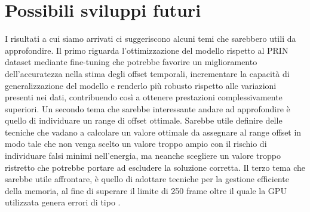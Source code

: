 \graphicspath{{chapters/chapter7/img}}
\chapter{Possibili sviluppi futuri} \label{sviluppi_futuri}
I risultati a cui siamo arrivati ci suggeriscono alcuni temi che sarebbero utili da approfondire. Il primo riguarda l'ottimizzazione del modello rispetto al PRIN dataset mediante fine-tuning che potrebbe favorire un miglioramento dell'accuratezza nella stima degli offset temporali, incrementare la capacità di generalizzazione del modello e renderlo più robusto rispetto alle variazioni presenti nei dati, contribuendo così a ottenere prestazioni complessivamente superiori. Un secondo tema che sarebbe interessante andare ad approfondire è quello di individuare un range di offset ottimale. Sarebbe utile definire delle tecniche che vadano a calcolare un valore ottimale da assegnare al range offset in modo tale che non venga scelto un valore troppo ampio con il rischio di individuare falsi minimi nell'energia, ma neanche scegliere un valore troppo ristretto che potrebbe portare ad escludere la soluzione corretta. Il terzo tema che sarebbe utile affrontare, è quello di adottare tecniche per la gestione efficiente della memoria, al fine di superare il limite di 250 frame oltre il quale la GPU utilizzata genera errori di tipo .